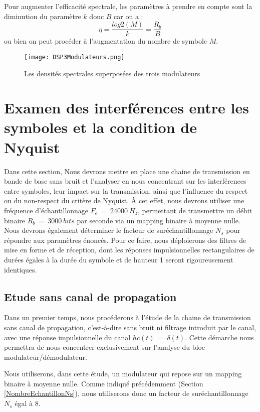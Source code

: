 \documentclass[11pt]{article}
\begin{document}
 
 Pour augmenter l'efficacité spectrale, les paramètres à prendre en compte sont la diminution du paramètre $k$ donc $B$ car on a :
 $$ \eta = \frac{log2(M)}{k} = \frac{R_b}{B}$$
 ou bien on peut procéder à l'augmentation du nombre de symbole $M$.
\begin{figure}[ht!]
            \centering
            \texttt{[image: DSP3Modulateurs.png]}
            \caption{ Les densités spectrales superposées des trois modulateurs\label{fig : DSP3Modulateurs}}
\end{figure}

\section{Examen des interférences entre les symboles et la condition de Nyquist}

Dans cette section, Nous devrons mettre en place une chaine de transmission en bande de base sans bruit et l'analyser en nous concentrant sur les interférences entre symboles, leur impact sur la transmission, ainsi que l'influence du respect ou du non-respect du critère de Nyquist. À cet effet, nous devrons utiliser une fréquence d'échantillonnage $F_e \ = \ 24000 \ H_z$, permettant de transmettre un débit binaire $R_b \ = \ 3000 \ bits$ par seconde via un mapping binaire à moyenne nulle. Nous devrons également déterminer le facteur de suréchantillonnage $N_s$ pour répondre aux paramètres énoncés. Pour ce faire, nous déploierons des filtres de mise en forme et de réception, dont les réponses impulsionnelles rectangulaires de durées égales à la durée du symbole et de hauteur 1 seront rigoureusement identiques.

    \subsection{Etude sans canal de propagation}
Dans un premier temps, nous procéderons à l'étude de la chaine de transmission sans canal de propagation, c'est-à-dire sans bruit ni filtrage introduit par le canal, avec une réponse impulsionnelle du canal $hc(t) \ = \ \delta(t)$. Cette démarche nous permettra de nous concentrer exclusivement sur l'analyse du bloc modulateur/démodulateur.

Nous utiliserons, dans cette étude, un modulateur qui repose sur un mapping binaire à moyenne nulle. Comme indiqué précédemment (Section \ref{NombreEchantillonNs}), nous utiliserons donc un facteur de suréchantillonnage $N_s$ égal à 8.
\end{document}
